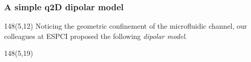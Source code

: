\begin{frame}
  \frametitle{A simple q2D dipolar model}

  \begin{textblock}{148}(5,12)
    Noticing the geometric confinement of the microfluidic channel, our colleagues at ESPCI proposed the following \emph{dipolar model}.
  \end{textblock}

  \begin{textblock}{148}(5,19)
    \begin{columns}[T]
      
      \begin{column}{0.45\textwidth}
        \vskip0.2cm
        \centering
      \end{column}
      

\end{columns}
\end{textblock}
\end{frame}
